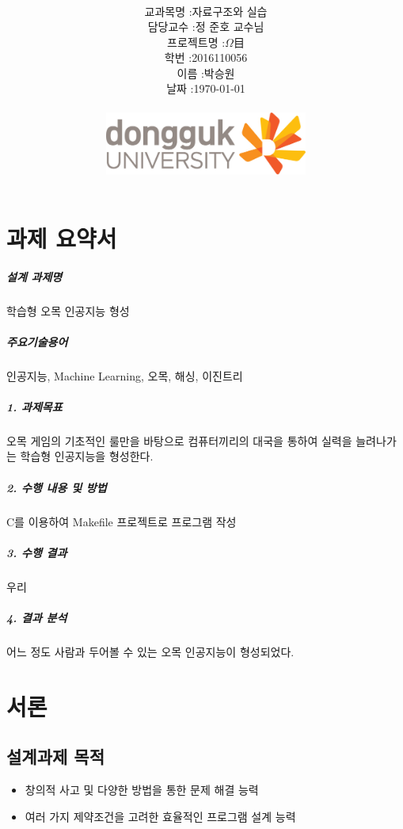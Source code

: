 \documentclass[12pt,a4paper]{report}
\title{
	\centering
	\pgfornament[width=12cm,color=teal]{84}\\
	\vspace{1cm}
	\fontsize{50}{50} \selectfont {오목 인공지능 형성\\설계과제 최종 보고서}\\
		\pgfornament[width=12cm,color=teal]{88}\\
	\vfill}
\author{
	\LARGE
	\begin{tabular}{rl}
		\hline
		교과목명 : & 자료구조와 실습\\
		담당교수 : & 정 준호 교수님\\
		프로젝트명 : & $ \Omega $目\\
		학번 : & 2016110056\\ 
		이름 : & 박승원\\
		날짜 : & \today\\
		\hline
	\end{tabular}\vspace{1cm}
	\\
\includegraphics[width=0.5\textwidth]{logo.jpg}
	}
\date{}
\begin{document}
\maketitle


\newpage
\tableofcontents
\newpage
\chapter*{과제 요약서}
\paragraph{설계 과제명} 학습형 오목 인공지능 형성\\ 
\paragraph{주요기술용어} 인공지능, Machine Learning, 오목, 해싱, 이진트리\\
\paragraph{1. 과제목표} 오목 게임의 기초적인 룰만을 바탕으로 컴퓨터끼리의 대국을 통하여 실력을 늘려나가는 학습형 인공지능을 형성한다.\\
\paragraph{2. 수행 내용 및 방법} C를 이용하여 Makefile 프로젝트로  프로그램 작성\\
\paragraph{3. 수행 결과} 우리 \\
\paragraph{4. 결과 분석} 어느 정도 사람과 두어볼 수 있는 오목 인공지능이 형성되었다.\\

\noindent
\chapter{서론}
\section{설계과제 목적}
\begin{itemize}
\item 창의적 사고 및 다양한 방법을 통한 문제 해결 능력
\item 여러 가지 제약조건을 고려한 효율적인 프로그램 설계 능력
\end{itemize}
\end{document}
